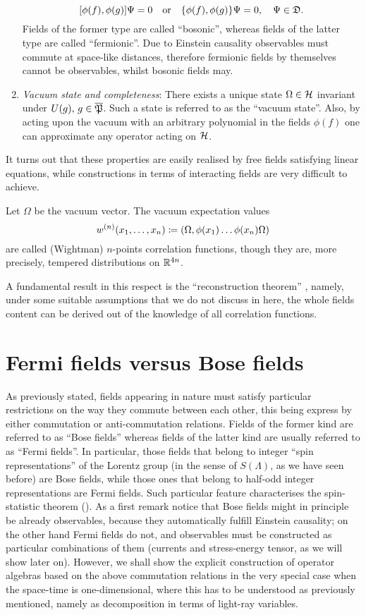 \begin{enumerate}[label=\Alph*.]
	\[
	[\phi(f),\phi(g)]\Psi=0\quad\text{or}\quad
	\{\phi(f),\phi(g)\}\Psi=0,\quad\Psi\in\mathfrak{D}. 
	\]
        Fields of the former type are called ``bosonic'', whereas
        fields of the latter type are called ``fermionic''. Due
        to Einstein causality observables must commute at space-like
        distances, therefore fermionic fields by themselves cannot be
        observables, whilst bosonic fields may.  
  \item \emph{Vacuum state and completeness}: There exists a unique state 
        $\Omega\in\mathcal{H}$ invariant under 
        $U(g),\,g\in\overline{\mathfrak{P}}$. Such a state is referred to as the 
        ``vacuum state''. Also, by acting upon the vacuum with an 
        arbitrary polynomial in the fields $\phi(f)$ one can approximate 
        any operator acting on $\mathcal{H}$.        
 \end{enumerate}
It turns out that these properties are easily realised by free fields
satisfying linear equations, while constructions in terms of 
interacting fields are very difficult to achieve.

 \begin{definition}
 Let $\Omega$ be the vacuum vector. The vacuum expectation values
 \[
 w^{(n)}(x_1,\ldots,x_n)\coloneqq
 (\Omega,\phi(x_1)\ldots\phi(x_n)\Omega)
 \]
 are called (Wightman) $n$-points correlation functions, though
 they are, more precisely, tempered distributions on $\mathbb{R}^{4n}$.
 \end{definition}
A fundamental result in this respect is the ``reconstruction theorem''
\cite*{Haag}, namely, under some suitable assumptions that we do not 
discuss in here, the whole fields content can be derived out of the 
knowledge of all correlation functions. 

\section{Fermi fields versus Bose fields}
\label{Fermi vs Bose}
As previously stated, fields appearing in nature must satisfy particular
restrictions on the way they commute between each other, this being
express by either commutation or anti-commutation relations. 
Fields of the former kind are referred to as ``Bose fields''
whereas fields of the latter kind are usually referred to as 
``Fermi fields''. In particular, those fields that belong 
to integer ``spin representations'' of the Lorentz group 
(in the sense of $S(\Lambda)$, as we have seen 
before) are Bose fields, while those ones that belong to
half-odd integer representations are Fermi fields. Such
particular feature characterises the spin-statistic
theorem (\cite{Haag}). As a first remark notice
that Bose fields might in principle be already observables, 
because they automatically fulfill Einstein causality; 
on the other hand Fermi fields do not, and observables 
must be constructed as particular combinations
of them (currents and stress-energy tensor, as we will 
show later on). However, we shall show the explicit 
construction of operator algebras based on the above 
commutation relations in the very special case when 
the space-time is one-dimensional, where this has
to be understood as previously mentioned, namely 
as decomposition in terms of light-ray variables.

